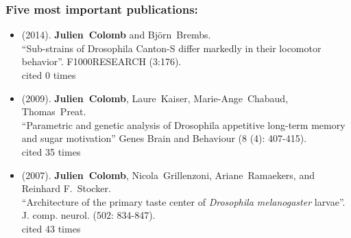 \subsubsection{Five most important publications:}
\label{sec:FiveMostImportantPublications}

\begin{sloppypar}
\newcommand{\enquote}[1]{``#1''}
\providecommand{\bibinfo}[2]{#2}
%
%
%
%   
%   
%     
\begin{itemize}   
 
\item  (\bibinfo{year}{2014}).
  \bibinfo{author}{\textbf{Julien~Colomb}} and \bibinfo{author}{Bj\"{o}rn~Brembs}. \\
\newblock \enquote{\bibinfo{title}{Sub-strains of Drosophila Canton-S differ markedly in their locomotor behavior}}.
\newblock \bibinfo{journal}{F1000RESEARCH}
  (\bibinfo{pages}{3:176}).
  \\cited 0 times%
  

\item   (\bibinfo{year}{2009}).  
 \bibinfo{author}{\textbf{Julien~Colomb}}, \bibinfo{author}{Laure~Kaiser}, \bibinfo{author}{Marie-Ange~Chabaud}, \bibinfo{author}{Thomas~Preat}.
\\
\newblock \enquote{\bibinfo{title}{Parametric and genetic analysis of Drosophila appetitive long-term memory and sugar motivation}}
\newblock \bibinfo{journal}{Genes Brain and Behaviour}
  (\bibinfo{pages}{8 (4): 407-415}).
   \\cited 35 times%
   

   

 
 
  \item  (\bibinfo{year}{2007}).
\bibinfo{author}{\textbf{Julien~Colomb}}, \bibinfo{author}{Nicola~Grillenzoni}, \bibinfo{author}{Ariane~Ramaekers}, and
  \bibinfo{author}{Reinhard F.~Stocker}.\\
\newblock \enquote{\bibinfo{title}{Architecture of the primary taste center of \textit{Drosophila melanogaster} larvae}}.
\newblock \bibinfo{journal}{J. comp. neurol.}
  (\bibinfo{pages}{502: 834-847}).
   \\  cited 43 times%


\end{itemize}
\end{sloppypar}
